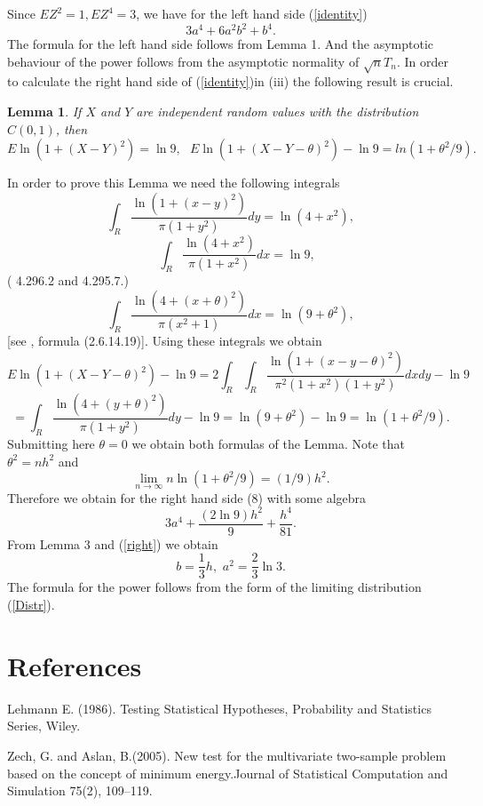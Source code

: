 \documentclass[final,11pt,3p]{elsarticle}
\newtheorem{lemma}{Lemma}
\begin{document}
Since $E Z^2=1, EZ^4=3$,  we have for the left hand side (\ref{identity})
\begin{equation}\label{left}
3a^4 + 6a^2b^2 + b^4.
 \end{equation}
 The formula for the left hand side follows from Lemma 1.
 And the asymptotic behaviour of the power follows from the asymptotic normality of $\sqrt nT_n$.
In order to calculate the right hand side of  (\ref{identity})in (iii)
 the following result is crucial.
\begin{lemma}If $X$ and $Y$ are independent random values with the distribution
$C(0,1)$, then
$$
 E \ln(1+ (X- Y)^2)= \ln 9,\,\,\,\,
 E \ln(1+ (X- Y - \theta)^2)-\ln 9
 =
ln(1+ \theta^2/9).
$$
\end{lemma}
In order to prove this Lemma we need the following integrals
$$
\int_{R}
\frac {\ln(1+(x-y)^2)}{\pi(1+y^2)} dy = \ln(4+x^2),
$$
$$
\quad \int_{R} \frac {\ln(4+x^2)}{\pi(1+x^2)} dx = \ln 9,
$$
(\cite{GradRyzh2007}  4.296.2 and 4.295.7.)
$$
\int_{R} \frac{\ln(4 +(x +\theta)^2 )}{\pi(x^2 +1)} dx = \ln(9+\theta^2),
$$
[see  \cite{PrudBrychMarich1981}, formula (2.6.14.19)].
Using these integrals we obtain
$$
 E \ln(1+ (X- Y - \theta)^2)-\ln 9  = 2\int_{R} \int_{R} \frac{\ln(1+(x-y-\theta)^2)}{\pi^2(1+x^2)(1+y^2)} dx dy -\ln 9
$$
$$
= \int_{R}\frac{\ln(4 +(y+\theta)^2)}{\pi(1+y^2)} dy- \ln 9= \ln(9+\theta^2) -\ln 9 = \ln(1+ \theta^2/9).
$$
Submitting here  $\theta=0$ we obtain both formulas of the Lemma.
Note that $\theta^2=nh^2$ and
$$
\lim_{n\to \infty} n \ln(1+ \theta^2/9)= (1/9)h^2.
$$
Therefore we obtain for the right hand side (8) with some algebra
\begin{equation}\label{right}
3a^4 + \frac{(2\ln 9 )h^2}{9} + \frac{h^4}{81}.
 \end{equation}
 From Lemma 3 and  (\ref{right}) we obtain
$$
b=\frac{1}{3} h,\,\,a^2=\frac{2}{3}\ln 3.
$$
The formula for the power follows from the form of the limiting distribution  (\ref{Distr}).


\section{References}
 Lehmann E. (1986).  Testing  Statistical  Hypotheses,  Probability  and  Statistics  Series,  Wiley.

Zech,  G. and Aslan, B.(2005).   New test for the multivariate two-sample problem based on the concept of minimum energy.Journal of Statistical Computation and Simulation 75(2), 109–119.
\end{document}

